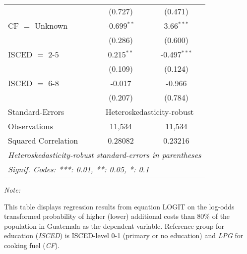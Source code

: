 \begin{table}[htbp!]
\begin{adjustbox}{width = 1\textwidth, max height = 0.95\textheight, center}
\begin{threeparttable}[b]
\begin{tabular}{lcc}
                                 & (0.727)        & (0.471)\\   
            CF $=$ Unknown       & -0.699$^{**}$  & 3.66$^{***}$\\   
                                 & (0.286)        & (0.600)\\   
            ISCED $=$ 2-5        & 0.215$^{**}$   & -0.497$^{***}$\\   
                                 & (0.109)        & (0.124)\\   
            ISCED $=$ 6-8        & -0.017         & -0.966\\   
                                 & (0.207)        & (0.784)\\   
            \midrule 
            Standard-Errors & \multicolumn{2}{c}{Heteroskedasticity-robust} \\ 
            Observations         & 11,534         & 11,534\\  
            Squared Correlation  & 0.28082        & 0.23216\\  
            \midrule \midrule
            \multicolumn{3}{l}{\emph{Heteroskedasticity-robust standard-errors in parentheses}}\\
            \multicolumn{3}{l}{\emph{Signif. Codes: ***: 0.01, **: 0.05, *: 0.1}}\\
         \end{tabular}
         
         \begin{tablenotes}\item \medskip \textit{Note:}
            \item This table displays regression results from equation LOGIT on the log-odds transformed probability of higher (lower) additional costs than 80\% of the population in Guatemala as the dependent variable. Reference group for education (\textit{ISCED}) is ISCED-level 0-1 (primary or no education) and \textit{LPG} for cooking fuel (\textit{CF}).
         \end{tablenotes}
      \end{threeparttable}
   \end{adjustbox}
\end{table}


